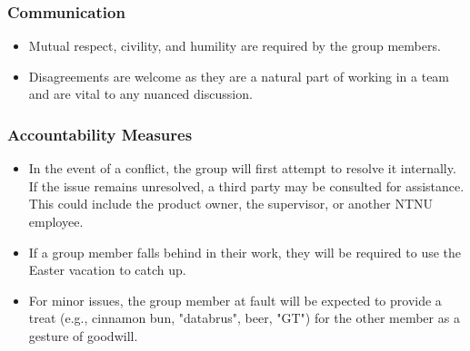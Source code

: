 \subsubsection{Communication}

\begin{itemize}
    \item Mutual respect, civility, and humility are required by the group members.
    \item Disagreements are welcome as they are a natural part of working in a team and are vital to any nuanced discussion.
\end{itemize}

\subsubsection{Accountability Measures}

\begin{itemize}
    \item In the event of a conflict, the group will first attempt to resolve it internally. If the issue remains unresolved, a third party may be consulted for assistance. This could include the product owner, the supervisor, or another NTNU employee.
    \item If a group member falls behind in their work, they will be required to use the Easter vacation to catch up.
    \item For minor issues, the group member at fault will be expected to provide a treat (e.g., cinnamon bun, "databrus", beer, "GT") for the other member as a gesture of goodwill.
\end{itemize}

\newpage
